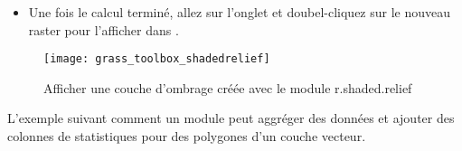 {\begin{itemize}[label=--]
\item Une fois le calcul terminé, allez sur l'onglet  et doubel-cliquez sur le nouveau raster  pour l'afficher dans \qg.
\end{itemize}

\begin{figure}[p]
 \begin{center}

 \texttt{[image: grass\_toolbox\_shadedrelief]}
  \caption{Afficher une couche d'ombrage créée avec le module \grass r.shaded.relief \nixcaption}\label{fig:grass_toolbox_shadedrelief}
 \end{center}
\end{figure}


L'exemple suivant comment un module \grass peut aggréger des données et ajouter des colonnes de statistiques pour des polygones d'un couche vecteur.

}

